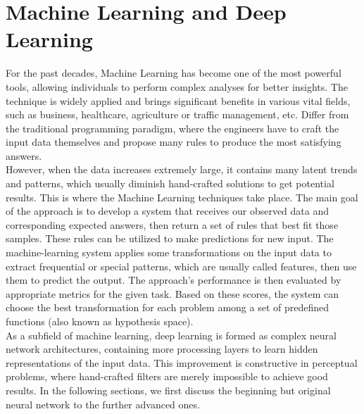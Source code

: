 \section{Machine Learning and Deep Learning}
For the past decades, Machine Learning has become one of the most powerful tools, allowing individuals to perform complex analyses for better insights. The technique is widely applied and brings significant benefits in various vital fields, such as business, healthcare, agriculture or traffic management, etc.
Differ from the traditional programming paradigm, where the engineers have to craft the input data themselves and propose many rules to produce the most satisfying answers. \\
However, when the data increases extremely large, it contains many latent trends and patterns, which usually diminish hand-crafted solutions to get potential results.
This is where the Machine Learning techniques take place. The main goal of the approach is to develop a system that receives our observed data and corresponding expected answers, then return a set of rules that best fit those samples. These rules can be utilized to make predictions for new input. 
The machine-learning system applies some transformations on the input data to extract frequential or special patterns, which are usually called features, then use them to predict the output. The approach’s performance is then evaluated by appropriate metrics for the given task. Based on these scores, the system can choose the best transformation for each problem among a set of predefined functions (also known as hypothesis space). \\
As a subfield of machine learning, deep learning is formed as complex neural network architectures, containing more processing layers to learn hidden representations of the input data. 
This improvement is constructive in perceptual problems, where hand-crafted filters are merely impossible to achieve good results. 
In the following sections, we first discuss the beginning but original neural network to the further advanced ones.
